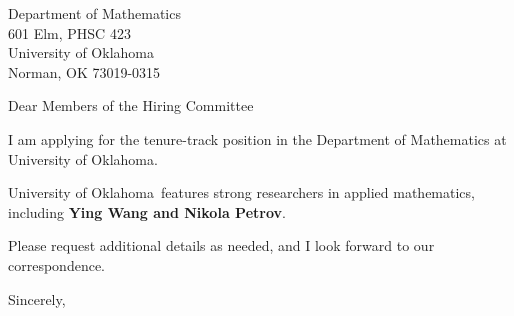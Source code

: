 




	
	
	\def\School{University of Oklahoma}
	
	\begin{letter}
		{Department of Mathematics\\
			601 Elm, PHSC 423\\
			University of Oklahoma\\
			Norman, OK 73019-0315
		}
		
		\opening{Dear Members of the Hiring Committee}
		
		
		I am applying for the tenure-track position in the Department of Mathematics at \School. 
		
		
		
		\School~features strong researchers in applied mathematics, including \textbf{Ying Wang and Nikola Petrov}. 
		
		
		
		
		
		Please request additional details as needed, and I look forward to our correspondence.
		
		\closing{Sincerely,}
	\end{letter}
